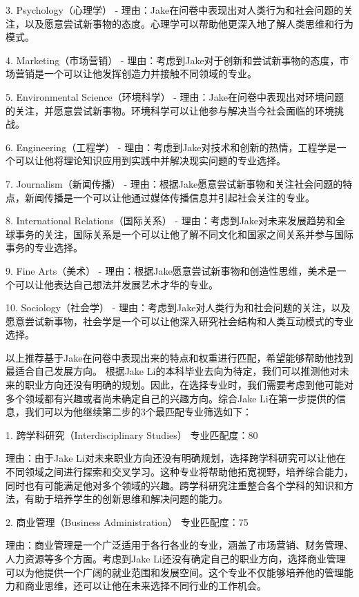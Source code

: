 \documentclass{extarticle}
\begin{document}
\begin{CJK*}{UTF8}{gbsn}
3. Psychology（心理学）
   - 理由：Jake在问卷中表现出对人类行为和社会问题的关注，以及愿意尝试新事物的态度。心理学可以帮助他更深入地了解人类思维和行为模式。

4. Marketing（市场营销）
   - 理由：考虑到Jake对于创新和尝试新事物的态度，市场营销是一个可以让他发挥创造力并接触不同领域的专业。

5. Environmental Science（环境科学）
   - 理由：Jake在问卷中表现出对环境问题的关注，并愿意尝试新事物。环境科学可以让他参与解决当今社会面临的环境挑战。

6. Engineering（工程学）
   - 理由：考虑到Jake对技术和创新的热情，工程学是一个可以让他将理论知识应用到实践中并解决现实问题的专业选择。

7. Journalism（新闻传播）
   - 理由：根据Jake愿意尝试新事物和关注社会问题的特点，新闻传播是一个可以让他通过媒体传播信息并引起社会关注的专业。

8. International Relations（国际关系）
   - 理由：考虑到Jake对未来发展趋势和全球事务的关注，国际关系是一个可以让他了解不同文化和国家之间关系并参与国际事务的专业选择。

9. Fine Arts（美术）
   - 理由：根据Jake愿意尝试新事物和创造性思维，美术是一个可以让他表达自己想法并发展艺术才华的专业。

10. Sociology（社会学）
    - 理由：考虑到Jake对人类行为和社会问题的关注，以及愿意尝试新事物，社会学是一个可以让他深入研究社会结构和人类互动模式的专业选择。 

以上推荐基于Jake在问卷中表现出来的特点和权重进行匹配，希望能够帮助他找到最适合自己发展方向。
根据Jake Li的本科毕业去向为待定，我们可以推测他对未来的职业方向还没有明确的规划。因此，在选择专业时，我们需要考虑到他可能对多个领域都有兴趣或者尚未确定自己的兴趣方向。综合Jake Li在第一步提供的信息，我们可以为他继续第二步的3个最匹配专业筛选如下：

1. 跨学科研究（Interdisciplinary Studies）
专业匹配度：80

理由：由于Jake Li对未来职业方向还没有明确规划，选择跨学科研究可以让他在不同领域之间进行探索和交叉学习。这种专业将帮助他拓宽视野，培养综合能力，同时也有可能满足他对多个领域的兴趣。跨学科研究注重整合各个学科的知识和方法，有助于培养学生的创新思维和解决问题的能力。

2. 商业管理（Business Administration）
专业匹配度：75

理由：商业管理是一个广泛适用于各行各业的专业，涵盖了市场营销、财务管理、人力资源等多个方面。考虑到Jake Li还没有确定自己的职业方向，选择商业管理可以为他提供一个广阔的就业范围和发展空间。这个专业不仅能够培养他的管理能力和商业思维，还可以让他在未来选择不同行业的工作机会。


\end{CJK*}
\end{document}
